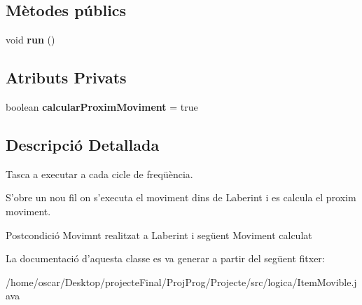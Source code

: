 \subsection*{Mètodes públics}
\begin{DoxyCompactItemize}
\item 
\hypertarget{classlogica_1_1_item_movible_1_1_tasca_aplicar_moviment_a254ed9b6dd534fe455f2de2fd2eab9e6}{void {\bfseries run} ()}\label{classlogica_1_1_item_movible_1_1_tasca_aplicar_moviment_a254ed9b6dd534fe455f2de2fd2eab9e6}

\end{DoxyCompactItemize}
\subsection*{Atributs Privats}
\begin{DoxyCompactItemize}
\item 
\hypertarget{classlogica_1_1_item_movible_1_1_tasca_aplicar_moviment_aabb4672ec6dc4a726e760915f2f2bd56}{boolean {\bfseries calcular\+Proxim\+Moviment} = true}\label{classlogica_1_1_item_movible_1_1_tasca_aplicar_moviment_aabb4672ec6dc4a726e760915f2f2bd56}

\end{DoxyCompactItemize}


\subsection{Descripció Detallada}
Tasca a executar a cada cicle de freqüència. 

S'obre un nou fil on s'executa el moviment dins de Laberint i es calcula el proxim moviment. \begin{DoxyPostcond}{Postcondició}
Movimnt realitzat a Laberint i següent Moviment calculat 
\end{DoxyPostcond}


La documentació d'aquesta classe es va generar a partir del següent fitxer\+:\begin{DoxyCompactItemize}
\item 
/home/oscar/\+Desktop/projecte\+Final/\+Proj\+Prog/\+Projecte/src/logica/Item\+Movible.\+java\end{DoxyCompactItemize}
